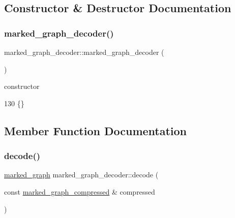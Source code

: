 \subsection{Constructor \& Destructor Documentation}
\mbox{\label{classmarked__graph__decoder_ad13aa15246efd3754b3ba7d2c28300d9}} 
\subsubsection{\texorpdfstring{marked\+\_\+graph\+\_\+decoder()}{marked\_graph\_decoder()}}
{\footnotesize\ttfamily marked\+\_\+graph\+\_\+decoder\+::marked\+\_\+graph\+\_\+decoder (\begin{DoxyParamCaption}{ }\end{DoxyParamCaption})\hspace{0.3cm}{\ttfamily [inline]}}



constructor 


\begin{DoxyCode}
130 \{\}
\end{DoxyCode}


\subsection{Member Function Documentation}
\mbox{\label{classmarked__graph__decoder_a31bbd76091acf5b058fd0a7b7948f74c}} 
\subsubsection{\texorpdfstring{decode()}{decode()}}
{\footnotesize\ttfamily \hyperlink{classmarked__graph}{marked\+\_\+graph} marked\+\_\+graph\+\_\+decoder\+::decode (\begin{DoxyParamCaption}\item[{const \hyperlink{classmarked__graph__compressed}{marked\+\_\+graph\+\_\+compressed} \&}]{compressed }\end{DoxyParamCaption})}


